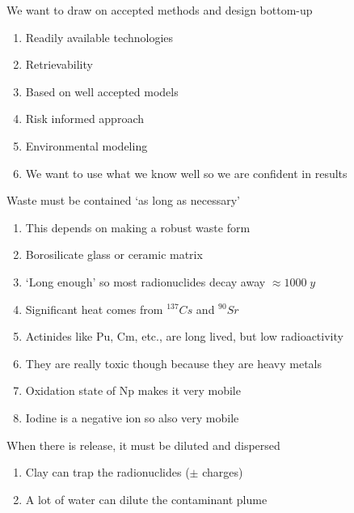 \documentclass[aspectratio=1610,pdftex,dvipsnames,compress,xcolor={dvipsnames}]{beamer}
\begin{document}
\begin{frame}{We want to draw on accepted methods and design bottom-up}
    \begin{enumerate}[series=outerlist,topsep=0pt,itemsep=21pt,leftmargin=*,label=(\arabic*)]
        \item[]Readily available technologies
        \item[]Retrievability
        \item[]Based on well accepted models
        \item[]Risk informed approach
        \item[]Environmental modeling
        \item[]We want to use what we know well so we are confident in results
    \end{enumerate}
\end{frame}


\begin{frame}{Waste must be contained `as long as necessary'}
    \begin{enumerate}[series=outerlist,topsep=0pt,itemsep=15pt,leftmargin=*,label=(\arabic*)]
        \item[]This depends on making a robust waste form 
        \item[]Borosilicate glass or ceramic matrix
        \item[]`Long enough' so most radionuclides decay away $\approx 1000 \; y$
        \item[]Significant heat comes from $^{137}Cs$ and $^{90}Sr$
        \item[]Actinides like Pu, Cm, etc., are long lived, but low radioactivity
        \item[]They are really toxic though because they are heavy metals
        \item[]Oxidation state of Np makes it very mobile
        \item[]Iodine is a negative ion so also very mobile
    \end{enumerate}
\end{frame}


\begin{frame}{When there is release, it must be diluted and dispersed}
    \begin{enumerate}[series=outerlist,topsep=0pt,itemsep=21pt,leftmargin=*,label=(\arabic*)]
        \item[]Clay can trap the radionuclides ($\pm$ charges)
        \item[]A lot of water can dilute the contaminant plume
    \end{enumerate}
\end{frame}
\end{document}
